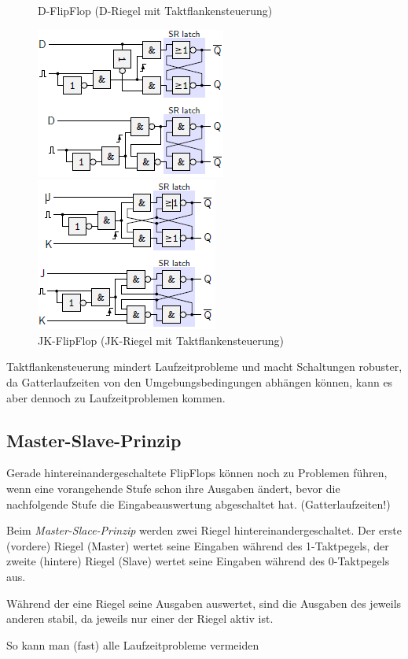 \documentclass[12pt]{report}
\begin{document}
\begin{figure}[H]
  \begin{minipage}[t]{0.45\textwidth}
    \caption{D-FlipFlop (D-Riegel mit Taktflankensteuerung)}
    \centering
    \includegraphics{taktflankensteuerung_d-flipflop}
  \end{minipage}
  \hfill
  \begin{minipage}[t]{0.45\textwidth}
    \caption{JK-FlipFlop (JK-Riegel mit Taktflankensteuerung)}
    \centering
    \includegraphics{taktflankensteuerung_jk-flipflop}
  \end{minipage}
\end{figure}

\begin{infobox}
  Taktflankensteuerung mindert Laufzeitprobleme und macht Schaltungen robuster, da Gatterlaufzeiten von den Umgebungsbedingungen abhängen können,
  kann es aber dennoch zu Laufzeitproblemen kommen.
\end{infobox}

\subsection{Master-Slave-Prinzip}
Gerade hintereinandergeschaltete FlipFlops können noch zu Problemen führen,
wenn eine vorangehende Stufe schon ihre Ausgaben ändert,
bevor die nachfolgende Stufe die Eingabeauswertung abgeschaltet hat. (Gatterlaufzeiten!)

\begin{defbox}
  Beim \textit{Master-Slace-Prinzip} werden zwei Riegel hintereinandergeschaltet. 
  Der erste (vordere) Riegel (Master) wertet seine Eingaben während des 1-Taktpegels, 
  der zweite (hintere) Riegel (Slave) wertet seine Eingaben während des 0-Taktpegels aus.

  Während der eine Riegel seine Ausgaben auswertet, sind die Ausgaben des jeweils anderen stabil,
  da jeweils nur einer der Riegel aktiv ist.

  So kann man (fast) alle Laufzeitprobleme vermeiden
\end{defbox}
\end{document}
